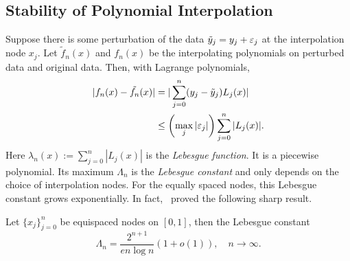 \subsection{Stability of Polynomial Interpolation}
\label{SSec: 2-Sta-Pol-Int}
Suppose there is some perturbation of the data $\tilde{y}_j = y_j + \varepsilon_j$ at the interpolation node $x_j$. Let $\tilde{f}_n(x)$ and $f_n(x)$ be the interpolating polynomials on perturbed data and original data. Then, with Lagrange polynomials, 
\begin{equation}
    \begin{aligned}
        |f_n(x) - \tilde{f_n}(x)| &= |\sum_{j=0}^n (y_j - \tilde{y}_j) L_j(x)| \\
        &\le \left(\max_{j} |\varepsilon_j|\right) \sum_{j=0}^n |L_j(x)|.
    \end{aligned}
\end{equation}
Here $\lambda_n(x) := \sum_{j=0}^n |L_j(x)|$ is the \emph{Lebesgue function}. It is a piecewise polynomial. Its maximum $\Lambda_n$ is the \emph{Lebesgue constant} and only depends on the choice of interpolation nodes. 
For the equally spaced nodes, this Lebesgue constant grows exponentially. In fact,~\cite{turetskii1940bounding} proved the following sharp result. 
\begin{lemma}
    \label{Lem: 2-Leb-Con}
    Let $\{x_j\}_{j=0}^n$ be equispaced nodes on $[0, 1]$, then the Lebesgue constant 
    \begin{equation}
      \Lambda_n  =  \frac{2^{n+1}}{e n \log n} \left(1 + o(1)\right), \quad n\to\infty. 
    \end{equation}
\end{lemma}
